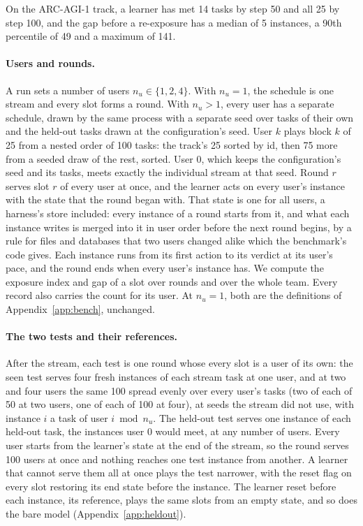On the ARC-AGI-1 track, a learner has met 14 tasks by step 50 and all 25 by step 100, and the gap before a re-exposure has a median of 5 instances, a 90th percentile of 49 and a maximum of 141.

\paragraph{Users and rounds.}
A run sets a number of users $n_u \in \{1, 2, 4\}$. With $n_u = 1$, the schedule is one stream and every slot forms a round. With $n_u > 1$, every user has a separate schedule, drawn by the same process with a separate seed over tasks of their own and the held-out tasks drawn at the configuration's seed. User $k$ plays block $k$ of 25 from a nested order of 100 tasks: the track's 25 sorted by id, then 75 more from a seeded draw of the rest, sorted. User 0, which keeps the configuration's seed and its tasks, meets exactly the individual stream at that seed. Round $r$ serves slot $r$ of every user at once, and the learner acts on every user's instance with the state that the round began with. That state is one for all users, a harness's store included: every instance of a round starts from it, and what each instance writes is merged into it in user order before the next round begins, by a rule for files and databases that two users changed alike which the benchmark's code gives. Each instance runs from its first action to its verdict at its user's pace, and the round ends when every user's instance has. We compute the exposure index and gap of a slot over rounds and over the whole team. Every record also carries the count for its user. At $n_u = 1$, both are the definitions of Appendix~\ref{app:bench}, unchanged.

\paragraph{The two tests and their references.}
After the stream, each test is one round whose every slot is a user of its own: the seen test serves four fresh instances of each stream task at one user, and at two and four users the same 100 spread evenly over every user's tasks (two of each of 50 at two users, one of each of 100 at four), at seeds the stream did not use, with instance $i$ a task of user $i \bmod n_u$. The held-out test serves one instance of each held-out task, the instances user 0 would meet, at any number of users. Every user starts from the learner's state at the end of the stream, so the round serves 100 users at once and nothing reaches one test instance from another. A learner that cannot serve them all at once plays the test narrower, with the reset flag on every slot restoring its end state before the instance. The learner reset before each instance, its reference, plays the same slots from an empty state, and so does the bare model (Appendix~\ref{app:heldout}).

